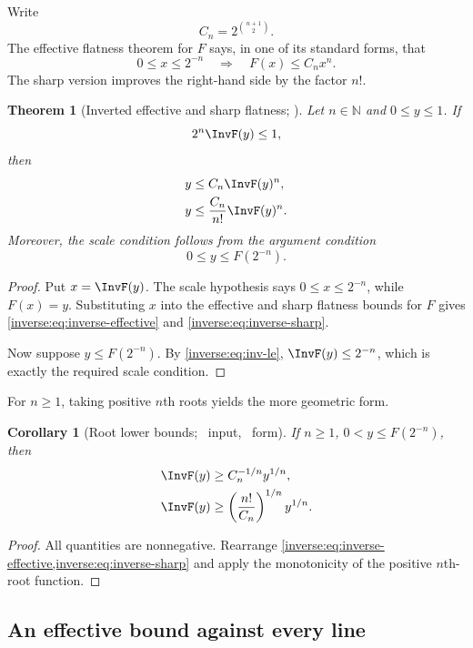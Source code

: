\documentclass[11pt,oneside]{article}
\newtheorem{theorem}{Theorem}[section]
\newtheorem{corollary}[corollary]{Corollary}
\theoremstyle{definition}
\theoremstyle{remark}
\newcommand{\N}{\mathbb N}
\begin{document}
Write
\[
 C_n=2^{\binom{n+1}{2}}.
\]
The effective flatness theorem for $F$ says, in one of its standard forms,
that
\[
 0\leq x\leq2^{-n}
 \quad\Longrightarrow\quad
 F(x)\leq C_nx^n. \label{inverse:eq:flatness-input}
\]
The sharp version improves the right-hand side by the factor $n!$.

\begin{theorem}[Inverted effective and sharp flatness; \Formalized]
\label{inverse:thm:inverted-flatness}
Let $n\in\N$ and $0\leq y\leq1$.  If
\[
 2^n\InvF(y)\leq1,
\]
then
\begin{align}
 y&\leq C_n\InvF(y)^n, \label{inverse:eq:inverse-effective}\\
 y&\leq \frac{C_n}{n!}\InvF(y)^n. \label{inverse:eq:inverse-sharp}
\end{align}
Moreover, the scale condition follows from the argument condition
\[
 0\leq y\leq F(2^{-n}).
\]
\end{theorem}

\begin{proof}
Put $x=\InvF(y)$.  The scale hypothesis says $0\leq x\leq2^{-n}$, while
$F(x)=y$.  Substituting $x$ into the effective and sharp flatness bounds
for $F$ gives \eqref{inverse:eq:inverse-effective} and
\eqref{inverse:eq:inverse-sharp}.

Now suppose $y\leq F(2^{-n})$.  By
\eqref{inverse:eq:inv-le}, $\InvF(y)\leq2^{-n}$, which is exactly the required
scale condition.
\end{proof}

For $n\geq1$, taking positive $n$th roots yields the more geometric form.

\begin{corollary}[Root lower bounds; \Formalized\ input, \Derived\ form]
\label{inverse:cor:root-lower}
If $n\geq1$, $0<y\leq F(2^{-n})$, then
\begin{align}
 \InvF(y)&\geq C_n^{-1/n}y^{1/n}, \label{inverse:eq:root-effective}\\
 \InvF(y)&\geq
 \left(\frac{n!}{C_n}\right)^{1/n}y^{1/n}. \label{inverse:eq:root-sharp}
\end{align}
\end{corollary}

\begin{proof}
All quantities are nonnegative.  Rearrange
\cref{inverse:eq:inverse-effective,inverse:eq:inverse-sharp} and apply the monotonicity of
the positive $n$th-root function.
\end{proof}

\subsection{An effective bound against every line}
\end{document}
